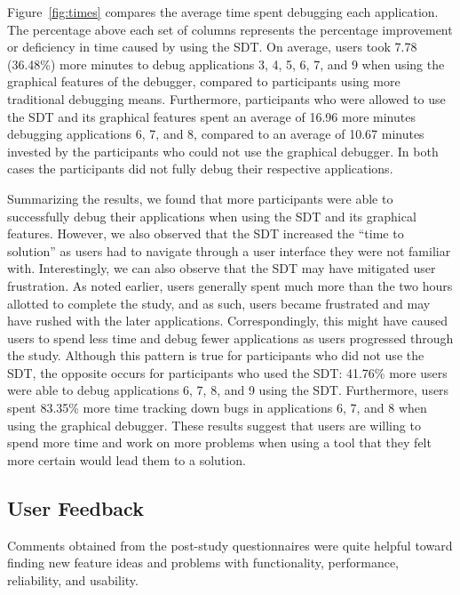 \documentclass[times, 10pt,twocolumn]{article}
\begin{document}
Figure~\ref{fig:times} compares the  average time spent debugging each
application. The  percentage above each set of  columns represents the
percentage improvement or deficiency in  time caused by using the SDT.
On  average,   users  took  7.78  (36.48\%)  more   minutes  to  debug
applications 3, 4, 5, 6, 7, and 9 when using the graphical features of
the  debugger,   compared  to  participants   using  more  traditional
debugging means. Furthermore, participants who were allowed to use the
SDT and its graphical features  spent an average of 16.96 more minutes
debugging applications  6, 7,  and 8, compared  to an average  of 10.67
minutes invested by  the participants who could not  use the graphical
debugger. In  both cases  the participants did  not fully  debug their
respective applications.

Summarizing the results, we found  that more participants were able to
successfully  debug their  applications  when using  the  SDT and  its
graphical features.  However, we  also observed that the SDT increased
the  ``time to  solution'' as  users had  to navigate  through  a user
interface  they were  not familiar  with. Interestingly,  we  can also
observe that  the SDT may  have mitigated user frustration.   As noted
earlier, users generally  spent much more than the  two hours allotted
to complete  the study, and as  such, users became  frustrated and may
have rushed  with the later applications.  Correspondingly, this might
have caused users  to spend less time and  debug fewer applications as
users progressed through the study.  Although this pattern is true for
participants  who  did  not  use  the SDT,  the  opposite  occurs  for
participants who used  the SDT: 41.76\% more users  were able to debug
applications 6,  7, 8, and 9  using the SDT.  Furthermore, users spent
83.35\% more time tracking down bugs  in applications 6, 7, and 8 when
using the  graphical debugger.  These  results suggest that  users are
willing to spend more time and work on more problems when using a tool
that they felt more certain would lead them to a solution.


\subsection{User Feedback}

Comments  obtained  from  the  post-study  questionnaires  were  quite
helpful  toward   finding  new   feature  ideas  and   problems  with
functionality, performance, reliability, and usability.
\end{document}
